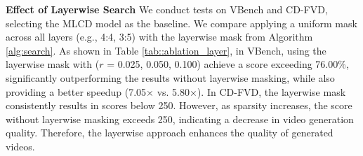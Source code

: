 
\textbf{Effect of Layerwise Search} We conduct tests on VBench and CD-FVD, selecting the MLCD model as the baseline. We compare applying a uniform mask across all layers (e.g., 4:4, 3:5) with the layerwise mask from Algorithm \ref{alg:search}. As shown in Table \ref{tab::ablation_layer}, in VBench, using the layerwise mask with ($r$ = 0.025, 0.050, 0.100) achieve a score exceeding 76.00\%, significantly outperforming the results without layerwise masking, while also providing a better speedup (7.05$\times$ vs. 5.80$\times$). In CD-FVD, the layerwise mask consistently results in scores below 250. However, as sparsity increases, the score without layerwise masking exceeds 250, indicating a decrease in video generation quality. Therefore, the layerwise approach enhances the quality of generated videos.


